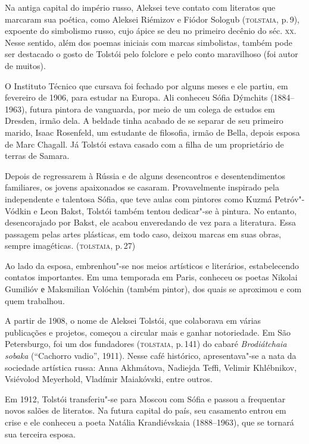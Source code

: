 Na antiga capital do império russo, Aleksei teve contato com literatos
que marcaram sua poética, como Aleksei Riémizov e Fiódor Sologub
(\textsc{tolstaia}, p.\,9), expoente do simbolismo russo, cujo ápice se deu no
primeiro decênio do séc. \textsc{xx}. Nesse sentido, além dos poemas iniciais com
marcas simbolistas, também pode ser destacado o gosto de Tolstói pelo
folclore e pelo conto maravilhoso (foi autor de muitos).

O Instituto Técnico que cursava foi fechado por alguns meses e ele
partiu, em fevereiro de 1906, para estudar na Europa. Ali conheceu Sófia
Dýmchits (1884--1963), futura pintora de vanguarda, por meio de um colega
de estudos em Dresden, irmão dela. A beldade tinha acabado de se separar
de seu primeiro marido, Isaac Rosenfeld, um estudante de filosofia,
irmão de Bella, depois esposa de Marc Chagall. Já Tolstói estava casado
com a filha de um proprietário de terras de Samara.

Depois de regressarem à Rússia e de alguns desencontros e
desentendimentos familiares, os jovens apaixonados se casaram.
Provavelmente inspirado pela independente e talentosa Sófia, que teve
aulas com pintores como Kuzmá Petróv"-Vódkin e Leon Bakst, Tolstói também
tentou dedicar"-se à pintura. No entanto, desencorajado por Bakst, ele
acabou enveredando de vez para a literatura. Essa passagem pelas artes
plásticas, em todo caso, deixou marcas em suas obras, sempre imagéticas.
(\textsc{tolstaia}, p.\,27)

Ao lado da esposa, embrenhou"-se nos meios artísticos e literários,
estabelecendo contatos importantes. Em uma temporada em Paris, conheceu
os poetas Nikolai Gumilióv е Maksmilian Volóchin (também pintor), dos
quais se aproximou e com quem trabalhou.

A partir de 1908, o nome de Aleksei Tolstói, que colaborava em várias
publicações e projetos, começou a circular mais e ganhar notoriedade. Em
São Petersburgo, foi um dos fundadores (\textsc{tolstaia}, p.\,141) do cabaré
\emph{Brodiátchaia sobaka} (``Cachorro vadio'', 1911). Nesse café
histórico, apresentava"-se a nata da sociedade artística russa: Anna
Akhmátova, Nadiejda Teffi, Velimir Khlébnikov, Vsiévolod Meyerhold,
Vladímir Maiakóvski, entre outros.

Em 1912, Tolstói transferiu"-se para Moscou com Sófia e passou a
frequentar novos salões de literatos. Na futura capital do país, seu
casamento entrou em crise e ele conheceu a poeta Natália Krandiévskaia
(1888--1963), que se tornará sua terceira esposa.

